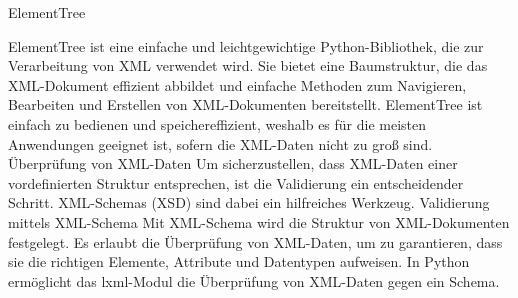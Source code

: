 ElementTree

ElementTree ist eine einfache und leichtgewichtige Python-Bibliothek, die zur Verarbeitung von \ac{XML} verwendet wird.
Sie bietet eine Baumstruktur, die das \ac{XML}-Dokument effizient abbildet und einfache Methoden zum Navigieren, Bearbeiten und Erstellen von \ac{XML}-Dokumenten bereitstellt.
ElementTree ist einfach zu bedienen und speichereffizient, weshalb es für die meisten Anwendungen geeignet ist, sofern die \ac{XML}-Daten nicht zu groß sind.
Überprüfung von \ac{XML}-Daten
Um sicherzustellen, dass \ac{XML}-Daten einer vordefinierten Struktur entsprechen, ist die Validierung ein entscheidender Schritt.
\ac{XML}-Schemas (XSD) sind dabei ein hilfreiches Werkzeug.
Validierung mittels \ac{XML}-Schema Mit \ac{XML}-Schema wird die Struktur von \ac{XML}-Dokumenten festgelegt.
Es erlaubt die Überprüfung von \ac{XML}-Daten, um zu garantieren, dass sie die richtigen Elemente, Attribute und Datentypen aufweisen.
In Python ermöglicht das lxml-Modul die Überprüfung von \ac{XML}-Daten gegen ein Schema.



\pagebreak